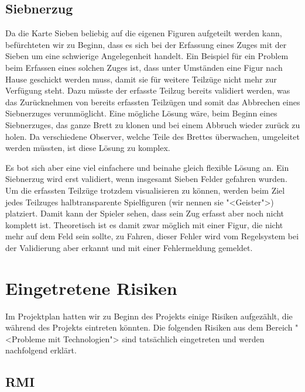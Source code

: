\documentclass[12pt,halfparskip]{scrartcl}
\begin{document}
\subsection{Siebnerzug}

Da die Karte Sieben beliebig auf die eigenen Figuren aufgeteilt werden kann, befürchteten wir zu Beginn, dass es sich bei der Erfassung eines Zuges mit der Sieben um eine schwierige Angelegenheit handelt. Ein Beispiel für ein Problem beim Erfassen eines solchen Zuges ist, dass unter Umständen eine Figur nach Hause geschickt werden muss, damit sie für weitere Teilzüge nicht mehr zur Verfügung steht. Dazu müsste der erfasste Teilzug bereits validiert werden, was das Zurücknehmen von bereits erfassten Teilzügen und somit das Abbrechen eines Siebnerzuges verunmöglicht. Eine mögliche Lösung wäre, beim Beginn eines Siebnerzuges, das ganze Brett zu klonen und bei einem Abbruch wieder zurück zu holen. Da verschiedene Observer, welche Teile des Brettes überwachen, umgeleitet werden müssten, ist diese Lösung zu komplex.

Es bot sich aber eine viel einfachere und beinahe gleich flexible Lösung an. Ein Siebnerzug wird erst validiert, wenn insgesamt Sieben Felder gefahren wurden. Um die erfassten Teilzüge trotzdem visualisieren zu können, werden beim Ziel jedes Teilzuges halbtransparente Spielfiguren (wir nennen sie "<Geister">) platziert. Damit kann der Spieler sehen, dass sein Zug erfasst aber noch nicht komplett ist. Theoretisch ist es damit zwar möglich mit einer Figur, die nicht mehr auf dem Feld sein sollte, zu Fahren, dieser Fehler wird vom Regelsystem bei der Validierung aber erkannt und mit einer Fehlermeldung gemeldet.

\clearpage
\section{Eingetretene Risiken}
\label{eingetretene_risiken}

Im Projektplan hatten wir zu Beginn des Projekts einige Risiken aufgezählt, die während des Projekts eintreten könnten. Die folgenden Risiken aus dem Bereich "<Probleme mit Technologien"> sind tatsächlich eingetreten und werden nachfolgend erklärt.


\subsection{RMI}
\label{sub:rmi}
\end{document}
